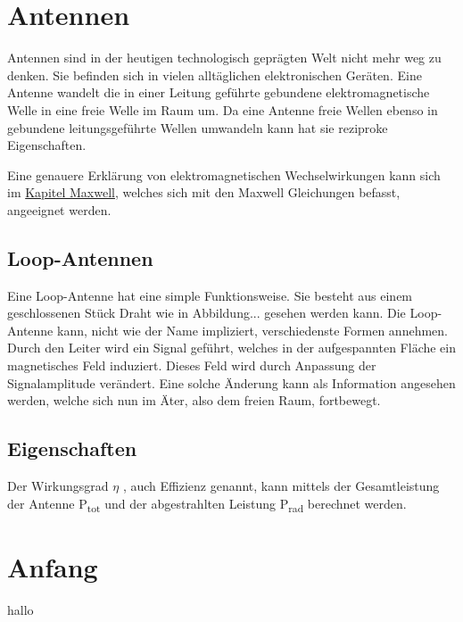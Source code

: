 %
%
% 
%
%

\section{Antennen\label{antennen:antennenAllgemein}}

Antennen sind in der heutigen technologisch geprägten Welt nicht mehr weg zu denken. Sie befinden sich in vielen alltäglichen elektronischen Geräten. Eine Antenne wandelt die in einer Leitung geführte gebundene elektromagnetische Welle in eine freie Welle im Raum um. Da eine Antenne freie Wellen ebenso in gebundene leitungsgeführte Wellen umwandeln kann hat sie reziproke Eigenschaften.

Eine genauere Erklärung von elektromagnetischen Wechselwirkungen kann sich im \href{chapter:maxwell}{Kapitel Maxwell}, welches sich mit den Maxwell Gleichungen befasst, angeeignet werden. 
\subsection{Loop-Antennen\label{antennen:antennenAllgemein_loop}}
Eine Loop-Antenne hat eine simple Funktionsweise. Sie besteht aus einem geschlossenen Stück Draht wie in Abbildung... gesehen werden kann. Die Loop-Antenne kann, nicht wie der Name impliziert, verschiedenste Formen annehmen. Durch den Leiter wird ein Signal geführt, welches in der aufgespannten Fläche ein magnetisches Feld induziert. Dieses Feld wird durch Anpassung der Signalamplitude verändert. Eine solche Änderung kann als Information angesehen werden, welche sich nun im Äter, also dem freien Raum, fortbewegt.

\subsection{Eigenschaften\label{antennen:antennenEigenschaften}}
Der Wirkungsgrad $\eta$ , auch Effizienz genannt, kann mittels der Gesamtleistung der Antenne P\textsubscript{tot} und der abgestrahlten Leistung P\textsubscript{rad} berechnet werden.
\section{Anfang\label{antennen:antennenAllgemein2}}

hallo